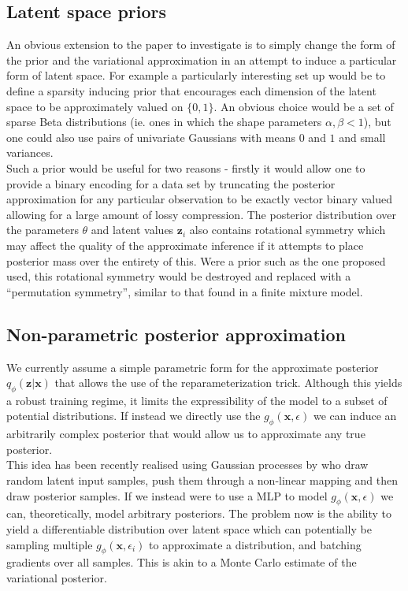 \documentclass[../report.tex]{subfiles}
\begin{document}
\subsection{Latent space priors}
An obvious extension to the paper to investigate is to simply change the form of the prior and the variational approximation in an attempt to induce a particular form of latent space. For example a particularly interesting set up would be to define a sparsity inducing prior that encourages each dimension of the latent space to be approximately valued on $\{0, 1\}$. An obvious choice would be a set of sparse Beta distributions (ie. ones in which the shape parameters $\alpha, \beta < 1$), but one could also use pairs of univariate Gaussians with means $0$ and $1$ and small variances.\\

Such a prior would be useful for two reasons - firstly it would allow one to provide a binary encoding for a data set by truncating the posterior approximation for any particular observation to be exactly vector binary valued allowing for a large amount of lossy compression. The posterior distribution over the parameters $\theta$ and latent values $\mathbf{z}_i$ also contains rotational symmetry which may affect the quality of the approximate inference if it attempts to place posterior mass over the entirety of this. Were a prior such as the one proposed used, this rotational symmetry would be destroyed and replaced with a ``permutation symmetry'', similar to that found in a finite mixture model.
\\
\subsection{Non-parametric posterior approximation}
We currently assume a simple parametric form for the approximate posterior $q_\phi(\mathbf{z}|\mathbf{x})$ that allows the use of the reparameterization trick. Although this yields a robust training regime, it limits the expressibility of the model to a subset of potential distributions. If instead we directly use the $g_\phi(\mathbf{x}, \epsilon)$ we can induce an arbitrarily complex posterior that would allow us to approximate any true posterior.\\
This idea has been recently realised using Gaussian processes by \cite{tran2015variational} who draw random latent input samples, push them through a non-linear mapping and then draw posterior samples. If we instead were to use a MLP to model $g_\phi(\mathbf{x}, \epsilon)$ we can, theoretically, model arbitrary posteriors. The problem now is the ability to yield a differentiable distribution over latent space which can potentially be sampling multiple $g_\phi(\mathbf{x}, \epsilon_i)$ to approximate a distribution, and batching gradients over all samples. This is akin to a Monte Carlo estimate of the variational posterior.
\end{document}
